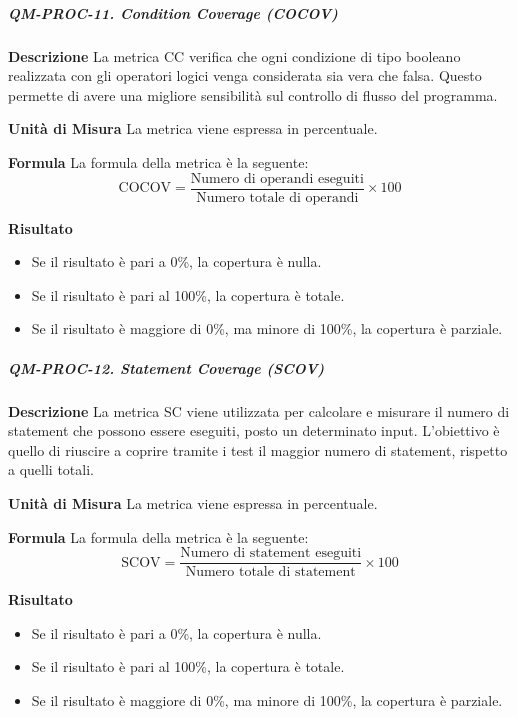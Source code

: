                 \subparagraph{QM-PROC-11. Condition Coverage (COCOV)}

                \textbf{Descrizione}
                La metrica CC verifica che ogni condizione di tipo booleano realizzata con gli operatori logici venga considerata sia vera che falsa. Questo permette di avere una migliore sensibilità sul controllo di flusso del programma.

                \textbf{Unità di Misura}
                La metrica viene espressa in percentuale.

                \textbf{Formula}
                La formula della metrica è la seguente:
                \[
                    \text{COCOV} = \frac{\text{Numero di operandi eseguiti}}{\text{Numero totale di operandi}} \times 100
                \]

                \textbf{Risultato}
                \begin{itemize}
                    \item Se il risultato è pari a 0\%, la copertura è nulla.
                    \item Se il risultato è pari al 100\%, la copertura è totale.
                    \item Se il risultato è maggiore di 0\%, ma minore di 100\%, la copertura è parziale.
                \end{itemize}


            \subparagraph{QM-PROC-12. Statement Coverage (SCOV)}

            \textbf{Descrizione}
            La metrica SC viene utilizzata per calcolare e misurare il numero di statement che possono essere eseguiti, posto un determinato input. L'obiettivo è quello di riuscire a coprire tramite i test il maggior numero di statement, rispetto a quelli totali.

            \textbf{Unità di Misura}
            La metrica viene espressa in percentuale.

            \textbf{Formula}
            La formula della metrica è la seguente:
            \[
                \text{SCOV} = \frac{\text{Numero di statement eseguiti}}{\text{Numero totale di statement}} \times 100
            \]

            \textbf{Risultato}
            \begin{itemize}
                \item Se il risultato è pari a 0\%, la copertura è nulla.
                \item Se il risultato è pari al 100\%, la copertura è totale.
                \item Se il risultato è maggiore di 0\%, ma minore di 100\%, la copertura è parziale.
            \end{itemize}

